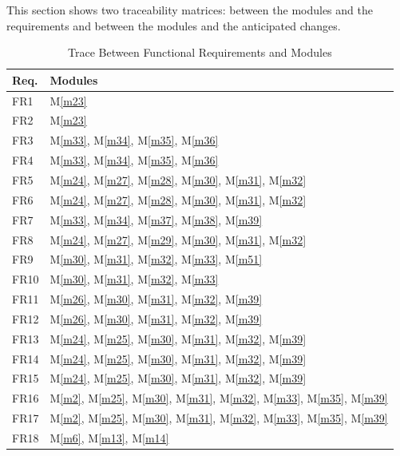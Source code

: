 \documentclass[12pt, titlepage]{article}
\newcommand{\mref}[1]{M\ref{#1}}
\begin{document}
	This section shows two traceability matrices: between the modules and the
	requirements and between the modules and the anticipated changes.
	
		\begin{longtable}{p{} p{}}
			\caption{Trace Between Functional Requirements and Modules}
			\label{TblRT1} \\
			\toprule
			\textbf{Req.} & \textbf{Modules}\\
			\midrule
			FR1 & \mref{m23} \\
			FR2 & \mref{m23} \\
			FR3 & \mref{m33}, \mref{m34}, \mref{m35}, \mref{m36} \\
			FR4 & \mref{m33}, \mref{m34}, \mref{m35}, \mref{m36} \\
			FR5 & \mref{m24}, \mref{m27}, \mref{m28}, \mref{m30}, \mref{m31}, \mref{m32} \\
			FR6 & \mref{m24}, \mref{m27}, \mref{m28}, \mref{m30}, \mref{m31}, \mref{m32} \\
			FR7 & \mref{m33}, \mref{m34}, \mref{m37}, \mref{m38}, \mref{m39}\\
			FR8 & \mref{m24}, \mref{m27}, \mref{m29}, \mref{m30}, \mref{m31}, \mref{m32} \\
			FR9 & \mref{m30}, \mref{m31}, \mref{m32}, \mref{m33}, \mref{m51} \\
			FR10 & \mref{m30}, \mref{m31}, \mref{m32}, \mref{m33} \\
			FR11 & \mref{m26}, \mref{m30}, \mref{m31}, \mref{m32}, \mref{m39} \\
			FR12 & \mref{m26}, \mref{m30}, \mref{m31}, \mref{m32}, \mref{m39} \\
			FR13 & \mref{m24}, \mref{m25}, \mref{m30}, \mref{m31}, \mref{m32}, \mref{m39} \\
			FR14 & \mref{m24}, \mref{m25}, \mref{m30}, \mref{m31}, \mref{m32}, \mref{m39} \\
			FR15 & \mref{m24}, \mref{m25}, \mref{m30}, \mref{m31}, \mref{m32}, \mref{m39} \\
			FR16 & \mref{m2}, \mref{m25}, \mref{m30}, \mref{m31}, \mref{m32}, \mref{m33}, \mref{m35}, \mref{m39} \\
			FR17 & \mref{m2}, \mref{m25}, \mref{m30}, \mref{m31}, \mref{m32}, \mref{m33}, \mref{m35}, \mref{m39} \\
			FR18 & \mref{m6}, \mref{m13}, \mref{m14}\\

\end{longtable}
\end{document}

